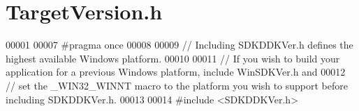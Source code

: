 \hypertarget{_target_version_8h_source}{}\section{Target\+Version.\+h}
\label{_target_version_8h_source}

\begin{DoxyCode}
00001 
00007 \textcolor{preprocessor}{#pragma once}
00008 
00009 \textcolor{comment}{// Including SDKDDKVer.h defines the highest available Windows platform.}
00010 
00011 \textcolor{comment}{// If you wish to build your application for a previous Windows platform, include WinSDKVer.h and}
00012 \textcolor{comment}{// set the \_WIN32\_WINNT macro to the platform you wish to support before including SDKDDKVer.h.}
00013 
00014 \textcolor{preprocessor}{#include <SDKDDKVer.h>}
\end{DoxyCode}
